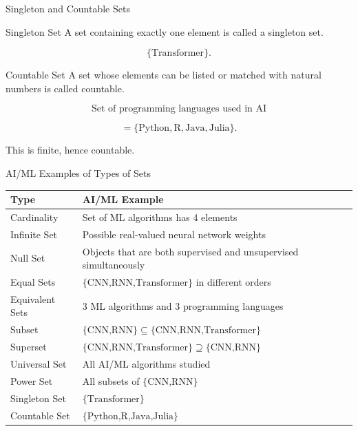 \documentclass[aspectratio=169]{beamer}
\begin{document}
\begin{frame}{Singleton and Countable Sets}
\begin{block}{Singleton Set}
A set containing exactly one element is called a singleton set.
\end{block}

\[
\{\text{Transformer}\}.
\]

\begin{block}{Countable Set}
A set whose elements can be listed or matched with natural numbers is called countable.
\end{block}

\[
\text{Set of programming languages used in AI}
\]

\[
=\{\text{Python},\text{R},\text{Java},\text{Julia}\}.
\]

This is finite, hence countable.
\end{frame}

\begin{frame}{AI/ML Examples of Types of Sets}
\small
\begin{center}
\begin{tabular}{|l|p{7.4cm}|}
\hline
\textbf{Type} & \textbf{AI/ML Example}\\
\hline
Cardinality & Set of ML algorithms has 4 elements\\
\hline
Infinite Set & Possible real-valued neural network weights\\
\hline
Null Set & Objects that are both supervised and unsupervised simultaneously\\
\hline
Equal Sets & $\{\text{CNN,RNN,Transformer}\}$ in different orders\\
\hline
Equivalent Sets & 3 ML algorithms and 3 programming languages\\
\hline
Subset & $\{\text{CNN,RNN}\}\subseteq\{\text{CNN,RNN,Transformer}\}$\\
\hline
Superset & $\{\text{CNN,RNN,Transformer}\}\supseteq\{\text{CNN,RNN}\}$\\
\hline
Universal Set & All AI/ML algorithms studied\\
\hline
Power Set & All subsets of $\{\text{CNN,RNN}\}$\\
\hline
Singleton Set & $\{\text{Transformer}\}$\\
\hline
Countable Set & $\{\text{Python,R,Java,Julia}\}$\\
\hline
\end{tabular}
\end{center}
\end{frame}
\end{document}
